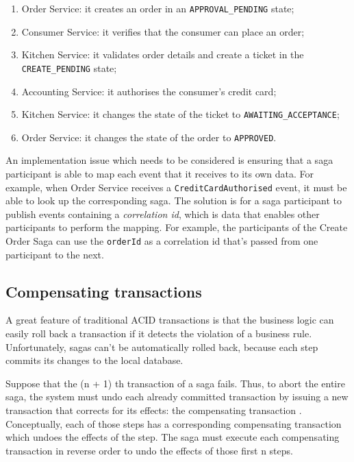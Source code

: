 \documentclass[conference]{IEEEtran}
\begin{document}
\begin{enumerate}
  \item Order Service: it creates an order in an \texttt{APPROVAL\_PENDING} state;
  \item Consumer Service: it verifies that the consumer can place an order;
  \item Kitchen Service: it validates order details and create a ticket in the \texttt{CREATE\_PENDING} state;
  \item Accounting Service: it authorises the consumer's credit card;
  \item Kitchen Service: it changes the state of the ticket to \texttt{AWAITING\_ACCEPTANCE};
  \item Order Service: it changes the state of the order to \texttt{APPROVED}.
\end{enumerate}

An implementation issue which needs to be considered is ensuring that a saga participant is able to map each event that it receives to its own data. For example, when Order Service receives a \texttt{CreditCardAuthorised} event, it must be able to look up the corresponding saga. The solution is for a saga participant to publish events containing a \textit{correlation id}, which is data that enables other participants to perform the mapping. For example, the participants of the Create Order Saga can use the \texttt{orderId} as a correlation id that's passed from one participant to the next.

\subsection{Compensating transactions}

A great feature of traditional ACID transactions is that the business logic can easily roll back a transaction if it detects the violation of a business rule. Unfortunately, sagas can't be automatically rolled back, because each step commits its changes to the local database. 

Suppose that the (n + 1) th transaction of a saga fails. Thus, to abort the entire saga, the system must undo each already committed transaction by issuing a new transaction that corrects for its effects: the compensating transaction \cite{compensating}. Conceptually, each of those steps has a corresponding compensating transaction which undoes the effects of the step. The saga must execute each compensating transaction in reverse order to undo the effects of those first n steps.
\end{document}
